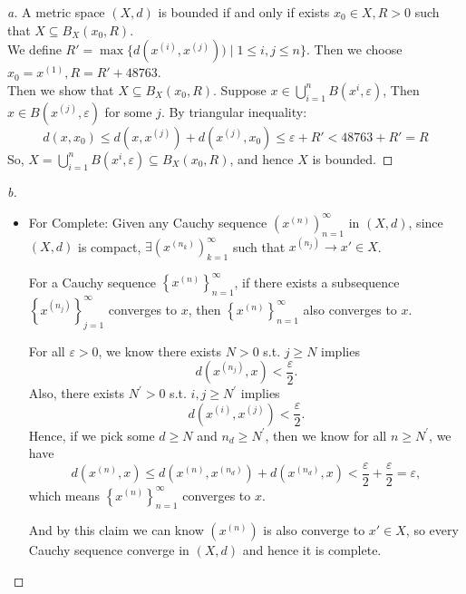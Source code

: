 \begin{proof}[a]
    A metric space $(X,d)$ is bounded if and only if exists $x_0 \in X, R > 0$ such that $X \subseteq B_X(x_0, R)$. \\
    We define $R' = \max\{d(x^{(i)},x^{(j)})) \mid 1 \leq i,j \leq n\}$. Then we choose $x_0 = x^{(1)}, R = R' + 48763$. \\
    Then we show that $X \subseteq B_X(x_0, R)$. Suppose $x \in \bigcup_{i=1}^{n} B(x^{i}, \varepsilon)$, Then $x \in B(x^{(j)}, \varepsilon)$ for some $j$.
    By triangular inequality:
    \[
    d(x, x_0) \leq d(x, x^{(j)}) + d(x^{(j)}, x_0) \leq \varepsilon + R' < 48763 + R' = R
    \]
    So, $X = \bigcup_{i=1}^{n} B(x^{i}, \varepsilon)\subseteq B_X(x_0, R)$, and hence $X$ is bounded.
\end{proof}
\begin{proof}[b]
    \vphantom{text}
    \begin{itemize}
        \item For Complete: Given any Cauchy sequence $(x^{(n)})_{n=1}^{\infty}$ in $(X, d)$, since $(X, d)$ is compact, $\exists (x^{(n_k)})_{k=1}^{\infty}$ such that $x^{(n_j)} \to x' \in X$. 
        \begin{claim}
            For a Cauchy sequence \(\left\{ x^{(n)} \right\}_{n=1}^{\infty}  \), if there exists a subsequence \(\left\{ x^{(n_j)} \right\}_{j=1}^{\infty}  \) converges to \(x\), then \(\left\{ x^{(n)} \right\}_{n=1}^{\infty}  \) also converges to \(x\).
        \end{claim}
        \begin{explanation}
            For all \(\varepsilon > 0\), we know there exists \(N > 0\) s.t. \(j \ge N\) implies 
            \[
                d\left( x^{(n_j)}, x \right) < \frac{\varepsilon}{2}. 
            \]  
            Also, there exists \(N^{\prime} > 0\) s.t. \(i, j \ge N^{\prime} \) implies
            \[
                d\left( x^{(i)}, x^{(j)} \right) < \frac{\varepsilon}{2}. 
            \]  
            Hence, if we pick some \(d \ge N\) and \(n_d \ge N^{\prime} \), then we know for all \(n \ge N^{\prime} \), we have 
            \[
                d \left( x^{(n)}, x \right) \le d \left( x^{(n)}, x^{(n_d)} \right) + d \left( x^{(n_d)}, x \right) < \frac{\varepsilon}{2} + \frac{\varepsilon}{2} = \varepsilon,
            \] which means \(\left\{ x^{(n)} \right\}_{n=1}^{\infty}  \) converges to \(x\).
        \end{explanation}
        And by this claim we can know $(x^{(n)})$ is also converge to $x' \in X$, so every Cauchy sequence converge in $(X, d)$ and hence it is complete.


\end{itemize}
\end{proof}
